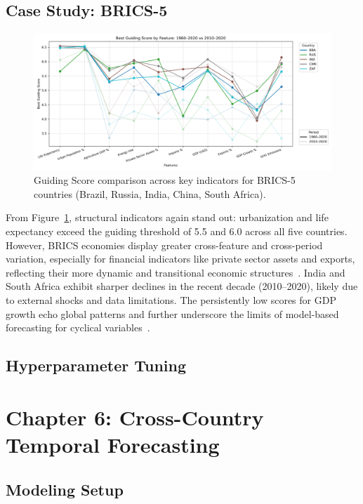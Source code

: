 \documentclass[12pt]{article}
\begin{document}
\subsection{Case Study: BRICS-5}
\begin{figure}[h]
    \centering
    \includegraphics[width=\textwidth]{comparison_feature_BRICS.png}
\caption{Guiding Score comparison across key indicators for BRICS-5 countries (Brazil, Russia, India, China, South Africa). }    
\label{fig:CaseStudyBRICS5}
\end{figure}
From Figure~\ref{fig:CaseStudyBRICS5}, structural indicators again 
 stand out: urbanization and life expectancy exceed the guiding threshold 
 of 5.5 and 6.0 across all five countries. However, BRICS economies display greater 
 cross-feature and cross-period variation, especially for financial 
 indicators like private sector assets and exports, reflecting their more 
 dynamic and transitional economic structures~\cite{Lin2012newstructural}. 
 India and South Africa exhibit sharper declines in the recent decade (2010–2020), 
 likely due to external shocks and data limitations. 
 The persistently low scores for GDP growth echo global 
 patterns and further underscore the limits of model-based forecasting 
 for cyclical variables~\cite{ClementsHendry2002}.


\subsection{Hyperparameter Tuning}

\section{Chapter 6: Cross-Country Temporal Forecasting}


\subsection{Modeling Setup}
\end{document}
